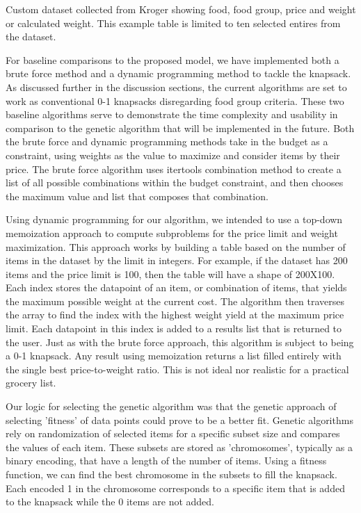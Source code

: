 \documentclass[10pt,journal,compsoc]{IEEEtran}
\begin{document}
\begin{table}[h]
    \setlength\tabcolsep{2pt}
    \centering
    
    \caption{Custom dataset collected from Kroger showing food, food group, price and weight or calculated weight. This example table is limited to ten selected entires from the dataset.}
    \label{table:Example of Groceries Dataset}
\end{table}

For baseline comparisons to the proposed model, we have implemented both a brute
force method and a dynamic programming method to tackle the knapsack. As
discussed further in the discussion sections, the current algorithms are set to
work as conventional 0-1 knapsacks disregarding food group criteria. These two
baseline algorithms serve to demonstrate the time complexity and usability in
comparison to the genetic algorithm that will be implemented in the future. Both
the brute force and dynamic programming methods take in the budget as a
constraint, using weights as the value to maximize and consider items by their
price. The brute force algorithm uses itertools combination method to create a
list of all possible combinations within the budget constraint, and then chooses
the maximum value and list that composes that combination.

Using dynamic programming for our algorithm, we intended to use a top-down
memoization approach to compute subproblems for the price limit and weight
maximization. This approach works by building a table based on the number of
items in the dataset by the limit in integers. For example, if the dataset has
200 items and the price limit is 100, then the table will have a shape of
200X100. Each index stores the datapoint of an item, or combination of items,
that yields the maximum possible weight at the current cost. The algorithm then
traverses the array to find the index with the highest weight yield at the
maximum price limit. Each datapoint in this index is added to a results list
that is returned to the user. Just as with the brute force approach, this
algorithm is subject to being a 0-1 knapsack. Any result using memoization
returns a list filled entirely with the single best price-to-weight ratio. This
is not ideal nor realistic for a practical grocery list.

Our logic for selecting the genetic algorithm was that the genetic approach of
selecting 'fitness' of data points could prove to be a better fit. Genetic
algorithms rely on randomization of selected items for a specific subset size
and compares the values of each item. These subsets are stored as 'chromosomes',
typically as a binary encoding, that have a length of the number of items. Using
a fitness function, we can find the best chromosome in the subsets to fill the
knapsack. Each encoded 1 in the chromosome corresponds to a specific item that
is added to the knapsack while the 0 items are not added. 
\end{document}
